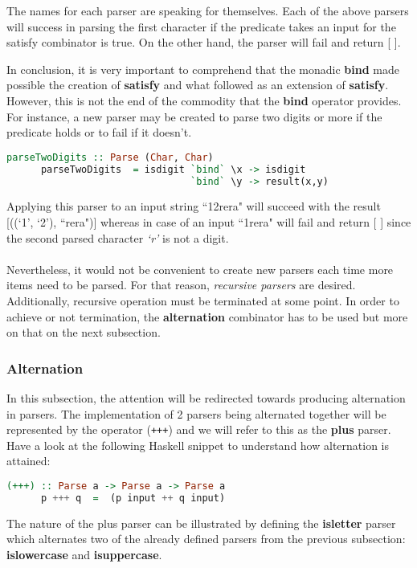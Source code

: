 \documentclass[a4paper, onecolumn]{article}
\begin{document}
    The names for each parser are speaking for themselves. Each of the above parsers will success in parsing the first character if the predicate takes an input for the satisfy combinator is true. On the other hand, the parser will fail and return [ ]. 
    
    In conclusion, it is very important to comprehend that the monadic \textbf{bind} made possible the creation of \textbf{satisfy} and what followed as an extension of \textbf{satisfy}. However, this is not the end of the commodity that the \textbf{bind} operator provides. For instance, a new parser may be created to parse two digits or more if the predicate holds or to fail if it doesn't. 
    
    \begin{tcolorbox}
    \begin{lstlisting}[language=Haskell]
      parseTwoDigits :: Parse (Char, Char)
      parseTwoDigits  = isdigit `bind` \x -> isdigit 
                                `bind` \y -> result(x,y)
    \end{lstlisting}
    \end{tcolorbox}
    
    Applying this parser to an input string ``12rera" will succeed with the result [((`1', `2'), ``rera")] whereas in case of an input ``1rera" will fail and return [ ] since the second parsed character \textit{`r'} is not a digit. \\ \\
    Nevertheless, it would not be convenient to create new parsers each time more items need to be parsed. For that reason, \textit{recursive parsers} are desired. Additionally, recursive operation must be terminated at some point. In order to achieve or not termination, the \textbf{alternation} combinator has to be used but more on that on the next subsection.
    \subsubsection{Alternation}
    
    In this subsection, the attention will be redirected towards producing alternation in parsers.  The implementation of 2 parsers being alternated together will be represented by the operator (\texttt{+++}) and we will refer to this as the \textbf{plus} parser. Have a look at the following Haskell snippet to understand how alternation is attained:
    
    \begin{tcolorbox}
    \begin{lstlisting}[language=Haskell]
      (+++) :: Parse a -> Parse a -> Parse a
      p +++ q  =  (p input ++ q input)
    \end{lstlisting}
    \end{tcolorbox}
    \noindent The nature of the plus parser can be illustrated by defining the \textbf{isletter} parser which alternates two of the already defined parsers from the previous subsection: \textbf{islowercase} and \textbf{isuppercase}.
    
\end{document}
